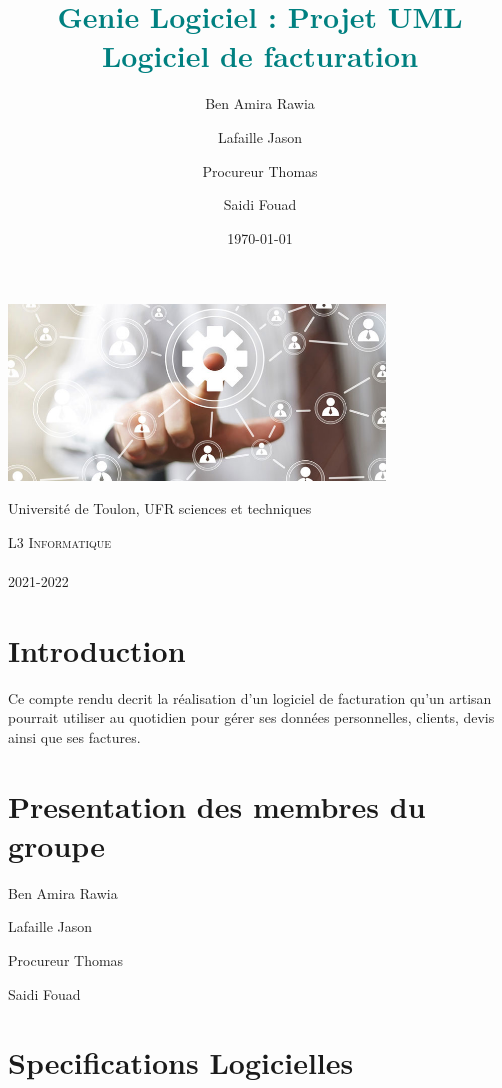 \documentclass[a4paper,10pt]{scrartcl}
\begin{document}
\title{\textcolor{teal}{Genie Logiciel : Projet UML \\ Logiciel de facturation }}


\author{Ben Amira Rawia \and Lafaille Jason \and  Procureur Thomas \and Saidi Fouad  }
\date{\today}
\maketitle
\centerline{\includegraphics[width=10cm]{ingenierie-informatique.jpg}}

\begin{center}
 

 Université de Toulon, UFR sciences et techniques
 
\textsc{\LARGE L3 Informatique }\\[1cm]
 
  
\HRule \\[0.2cm]
 {2021-2022}
\HRule\\
\end{center}

\newpage
\tableofcontents
\newpage

\section*{Introduction}
Ce compte rendu decrit la réalisation
d'un logiciel de facturation qu’un artisan  pourrait utiliser au quotidien pour gérer ses  données personnelles, clients, devis ainsi que ses factures.

\section{Presentation des membres du groupe}
{\color{olive}
Ben Amira Rawia

Lafaille Jason

Procureur Thomas

Saidi Fouad
}

\section{Specifications Logicielles}
\end{document}
